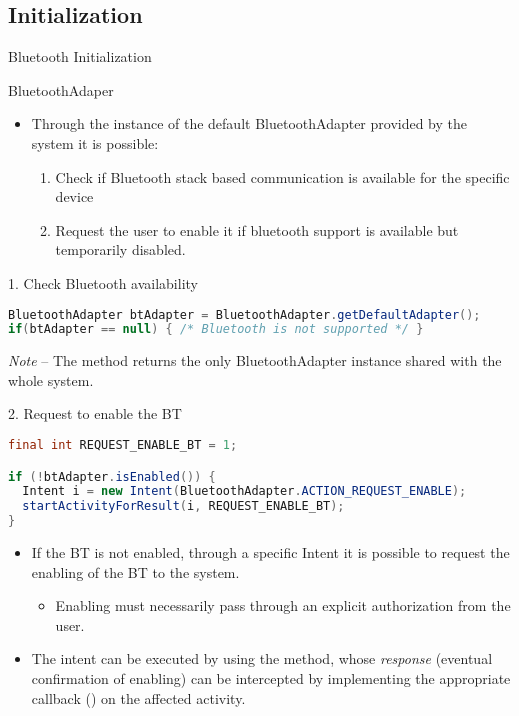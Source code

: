 \documentclass{beamer}
\begin{document}
\subsection{Initialization}

  \begin{frame}{Bluetooth Initialization}
    \begin{block}{BluetoothAdaper}
      \begin{itemize}
        \item Through the instance of the default BluetoothAdapter provided by the
        system it is possible: 
        \begin{enumerate}
          \item Check if Bluetooth stack based communication is available for the
          specific device
          \item Request the user to enable it if bluetooth support is available
          but temporarily disabled.
        \end{enumerate}
      \end{itemize}
    \end{block}
    \begin{exampleblock}{1. Check Bluetooth availability}
      \begin{lstlisting}[language=Java]
BluetoothAdapter btAdapter = BluetoothAdapter.getDefaultAdapter();
if(btAdapter == null) { /* Bluetooth is not supported */ }
      \end{lstlisting}
    \end{exampleblock}
    \begin{small}
    \textit{Note} -- The  method returns the only
    BluetoothAdapter instance shared with the whole system.
    \end{small}
    \begin{exampleblock}{2. Request to enable the BT}
    \begin{lstlisting}[language=Java]
final int REQUEST_ENABLE_BT = 1;

if (!btAdapter.isEnabled()) {
  Intent i = new Intent(BluetoothAdapter.ACTION_REQUEST_ENABLE);
  startActivityForResult(i, REQUEST_ENABLE_BT);
}
    \end{lstlisting}
    \end{exampleblock}
    \begin{itemize}
      \item If the BT is not enabled, through a specific Intent it is possible
      to request the enabling of the BT to the system.
      \begin{itemize}
        \item Enabling must necessarily pass through an explicit authorization
        from the user.
      \end{itemize}
      \item The intent can be executed by using the
       method, whose \textit{response} (eventual
      confirmation of enabling) can be intercepted by implementing the
      appropriate callback () on the affected
      activity.
    \end{itemize}


\end{frame}
\end{document}

